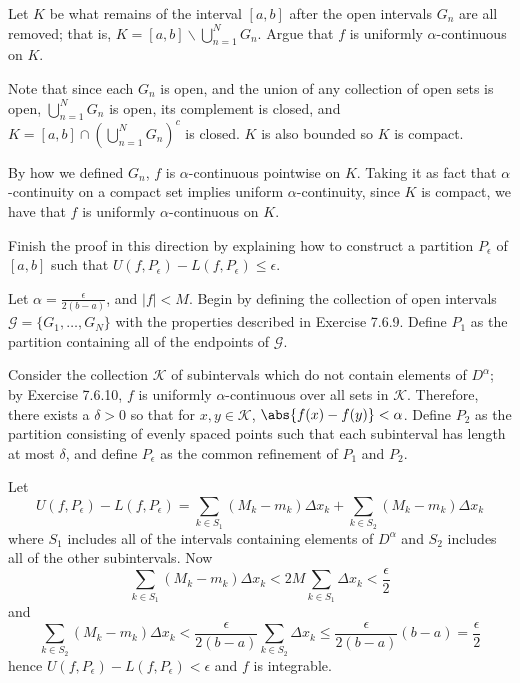 \begin{exercise}
Let \(K\) be what remains of the interval \([a,b]\) after the open intervals \(G_n\) are all removed; that is, \(K = [a,b]\backslash \bigcup^N_{n=1} G_n\). Argue that \(f\) is uniformly \(\alpha\)-continuous on \(K\).
\end{exercise}
\begin{solution}
    Note that since each \(G_n\) is open, and the union of any collection of open sets is open, \(\bigcup^N_{n=1} G_n\) is open, its complement is closed, and \(K = [a,b] \cap (\bigcup^N_{n=1} G_n)^c\) is closed. \(K\) is also bounded so \(K\) is compact.

    By how we defined \(G_n\), \(f\) is \(\alpha\)-continuous pointwise on \(K\). Taking it as fact that \(\alpha\)-continuity on a compact set implies uniform \(\alpha\)-continuity, since \(K\) is compact, we have that \(f\) is uniformly \(\alpha\)-continuous on \(K\).
\end{solution}

\begin{exercise}
Finish the proof in this direction by explaining how to construct a partition \(P_\epsilon\) of \([a,b]\) such that \(U(f,P_\epsilon) - L(f, P_\epsilon) \leq \epsilon\).
\end{exercise}
\begin{solution}
Let \(\alpha = \frac{\epsilon}{2(b-a)}\), and \(|f| < M\). Begin by defining the collection of open intervals \(\mathcal{G} = \{G_1, \dots, G_N\}\) with the properties described in Exercise 7.6.9. Define \(P_1\) as the partition containing all of the endpoints of \(\mathcal{G}\).

Consider the collection \(\mathcal{K}\) of subintervals which do not contain elements of \(D^\alpha\); by Exercise 7.6.10, \(f\) is uniformly \(\alpha\)-continuous over all sets in \(\mathcal{K}\). Therefore, there exists a \(\delta > 0\) so that for \(x, y \in \mathcal{K}\), \(\abs{f(x) - f(y)} < \alpha\). Define \(P_2\) as the partition consisting of evenly spaced points such that each subinterval has length at most \(\delta\), and define \(P_\epsilon\) as the common refinement of \(P_1\) and \(P_2\).

Let
\[U(f,P_\epsilon) - L(f, P_\epsilon) = \sum_{k \in S_1} (M_k - m_k) \Delta x_k + \sum_{k \in S_2} (M_k - m_k) \Delta x_k \]
where \(S_1\) includes all of the intervals containing elements of \(D^\alpha\) and \(S_2\) includes all of the other subintervals. Now
\[\sum_{k \in S_1} (M_k - m_k) \Delta x_k < 2M \sum_{k \in S_1} \Delta x_k < \frac{\epsilon}{2} \]
and
\[\sum_{k \in S_2} (M_k - m_k) \Delta x_k < \frac{\epsilon}{2(b-a)}\sum_{k \in S_2} \Delta x_k \leq \frac{\epsilon}{2(b-a)} (b-a) = \frac{\epsilon}{2} \]
hence \(U(f, P_\epsilon) - L(f, P_\epsilon) < \epsilon\) and \(f\) is integrable.

\end{solution}
